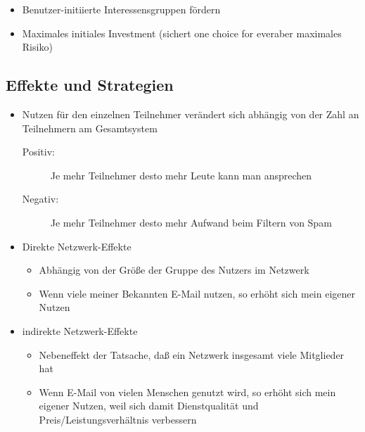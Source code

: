 \documentclass{article} %
\begin{document}
	\begin{itemize}
		\item Benutzer-initiierte Interessensgruppen fördern
		\item Maximales initiales Investment (sichert \glqq one choice for ever\grqq aber maximales Risiko)
	\end{itemize}
	\subsection{Effekte und Strategien}
	\begin{itemize}
		\item Nutzen für den einzelnen Teilnehmer verändert sich
abhängig von der Zahl an Teilnehmern am Gesamtsystem
		\begin{description}
			\item[Positiv:] Je mehr Teilnehmer desto mehr Leute kann man ansprechen
			\item[Negativ:] Je mehr Teilnehmer desto mehr Aufwand beim Filtern von Spam
		\end{description}
		\item Direkte Netzwerk-Effekte
		\begin{itemize}
			\item Abhängig von der Größe der Gruppe des Nutzers im Netzwerk
			\item Wenn viele meiner Bekannten E-Mail nutzen, so erhöht sich mein eigener Nutzen
		\end{itemize}
		\item indirekte Netzwerk-Effekte
		\begin{itemize}
			\item Nebeneffekt der Tatsache, daß ein Netzwerk
insgesamt viele Mitglieder hat
			\item Wenn E-Mail von vielen Menschen genutzt wird, so erhöht
sich mein eigener Nutzen, weil sich damit Dienstqualität und
Preis/Leistungsverhältnis verbessern
		\end{itemize}
	\end{itemize}
\end{document}
